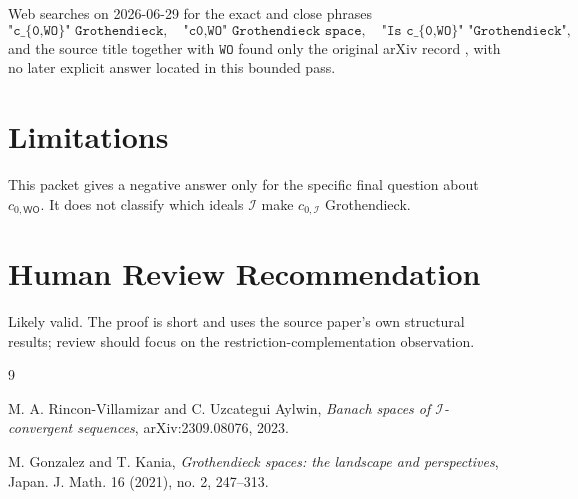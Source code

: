 \documentclass[11pt]{article}
\newcommand{\WO}{\mathsf{WO}}
\newcommand{\I}{\mathcal I}
\begin{document}
Web searches on 2026-06-29 for the exact and close phrases
\[
\texttt{"c\_\{0,WO\}" Grothendieck},\quad
\texttt{"c0,WO" Grothendieck space},\quad
\texttt{"Is c\_\{0,WO\}" "Grothendieck"},
\]
and the source title together with \(\texttt{WO}\) found only the original
arXiv record \cite{rvu2023}, with no later explicit answer located in this
bounded pass.

\section*{Limitations}

This packet gives a negative answer only for the specific final question about
\(c_{0,\WO}\).  It does not classify which ideals \(\I\) make \(c_{0,\I}\)
Grothendieck.

\section*{Human Review Recommendation}

Likely valid.  The proof is short and uses the source paper's own structural
results; review should focus on the restriction-complementation observation.

\begin{thebibliography}{9}

M. A. Rincon-Villamizar and C. Uzcategui Aylwin,
\emph{Banach spaces of \(\mathcal I\)-convergent sequences},
arXiv:2309.08076, 2023.

M. Gonzalez and T. Kania,
\emph{Grothendieck spaces: the landscape and perspectives},
Japan. J. Math. 16 (2021), no. 2, 247--313.

\end{thebibliography}
\end{document}
